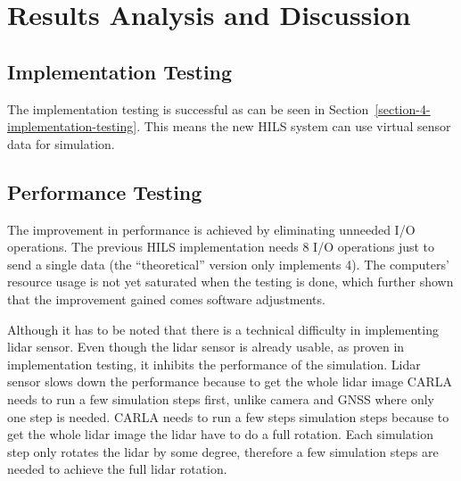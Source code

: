 \section{Results Analysis and Discussion}

\subsection{Implementation Testing}

The implementation testing is successful as can be seen in
Section~\ref{section-4-implementation-testing}. This means the new HILS system
can use virtual sensor data for simulation.

\subsection{Performance Testing}

The improvement in performance is achieved by eliminating unneeded I/O
operations. The previous HILS implementation needs 8 I/O operations just to send
a single data (the ``theoretical'' version only implements 4). The computers'
resource usage is not yet saturated when the testing is done, which further
shown that the improvement gained comes software adjustments.

Although it has to be noted that there is a technical difficulty in implementing
lidar sensor. Even though the lidar sensor is already usable, as proven in
implementation testing, it inhibits the performance of the simulation. Lidar
sensor slows down the performance because to get the whole lidar image CARLA
needs to run a few simulation steps first, unlike camera and GNSS where only one
step is needed. CARLA needs to run a few steps simulation steps because to get
the whole lidar image the lidar have to do a full rotation. Each simulation step
only rotates the lidar by some degree, therefore a few simulation steps are
needed to achieve the full lidar rotation.